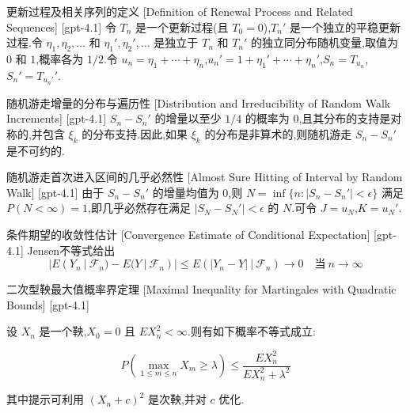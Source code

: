 \documentclass[UTF8]{ctexart}
\begin{document}
    
    
    \begin{dfn}
        {更新过程及相关序列的定义}
        [Definition of Renewal Process and Related Sequences]
        [gpt-4.1]
        令 $T_n$ 是一个更新过程(且 $T_0 = 0$),$T_n'$ 是一个独立的平稳更新过程.令 $\eta_1, \eta_2, \ldots$ 和 $\eta_1', \eta_2', \ldots$ 是独立于 $T_n$ 和 $T_n'$ 的独立同分布随机变量,取值为 $0$ 和 $1$,概率各为 $1/2$.令 $
u_n = \eta_1 + \cdots + \eta_n$,$
u_n' = 1 + \eta_1' + \cdots + \eta_n'$,$S_n = T_{
u_n}$,$S_n' = T_{
u_n'}'$.
    \end{dfn}
    
    
    
    \begin{ppt}
        {随机游走增量的分布与遍历性}
        [Distribution and Irreducibility of Random Walk Increments]
        [gpt-4.1]
        $S_n - S_n'$ 的增量以至少 $1/4$ 的概率为 $0$,且其分布的支持是对称的,并包含 $\xi_k$ 的分布支持.因此,如果 $\xi_k$ 的分布是非算术的,则随机游走 $S_n - S_n'$ 是不可约的.
    \end{ppt}
    
    
    
    \begin{thm}
        {随机游走首次进入区间的几乎必然性}
        [Almost Sure Hitting of Interval by Random Walk]
        [gpt-4.1]
        由于 $S_n - S_n'$ 的增量均值为 $0$,则 $N = \inf\{n : |S_n - S_n'| < \epsilon\}$ 满足 $P(N < \infty) = 1$,即几乎必然存在满足 $|S_N - S_N'| < \epsilon$ 的 $N$.可令 $J = 
u_N$,$K = 
u_N'$.
    \end{thm}
    
    
    
    \begin{thm}
        {条件期望的收敛性估计}
        [Convergence Estimate of Conditional Expectation]
        [gpt-4.1]
        Jensen不等式给出
\[
| E ( Y _ { n } ~|~ { \mathcal F } _ { n } ) - E ( Y ~|~ { \mathcal F } _ { n } ) | \leq E ( | Y _ { n } - Y | ~|~ { \mathcal F } _ { n } ) \to 0 \quad \text{当}~ n \to \infty
\]

    \end{thm}
    
    
    
    \begin{thm}
        {二次型鞅最大值概率界定理}
        [Maximal Inequality for Martingales with Quadratic Bounds]
        [gpt-4.1]
        
设 $X_n$ 是一个鞅,$X_0 = 0$ 且 $E X_n^2 < \infty$.则有如下概率不等式成立:

\[
P \left( \max_{1 \leq m \leq n} X_{m} \geq \lambda \right) \leq \frac{E X_{n}^{2}}{E X_{n}^{2} + \lambda^{2}}
\]

其中提示可利用 $( X_{n} + c )^{2}$ 是次鞅,并对 $c$ 优化.

    \end{thm}
    
\end{document}
